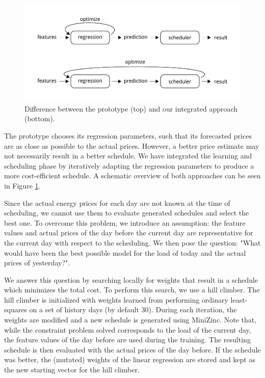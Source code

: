 \documentclass[a4,10pt]{article}
\begin{document}
\begin{figure}
	\centering
	\includegraphics[width=\textwidth]{img/feedback.pdf}
	\caption{Difference between the prototype (top) and our integrated approach (bottom).}
	\label{fig:feedback}
\end{figure}

The prototype chooses its regression parameters, such that its forecasted prices are as close as possible to the actual prices. However, a better price estimate may not necessarily result in a better schedule\cite{ifrim2012properties}. We have integrated the learning and scheduling phase by iteratively adapting the regression parameters to produce a more cost-efficient schedule. A schematic overview of both approaches can be seen in Figure \ref{fig:feedback}.

Since the actual energy prices for each day are not known at the time of scheduling, we cannot use them to evaluate generated schedules and select the best one. To overcome this problem, we introduce an assumption: the feature values and actual prices of the day before the current day are representative for the current day with respect to the scheduling. We then pose the question: "What would have been the best possible model for the load of today and the actual prices of yesterday?".

We answer this question by searching locally for weights that result in a schedule which minimizes the total cost. To perform this search, we use a hill climber. The hill climber is initialized with weights learned from performing ordinary least-squares on a set of history days (by default 30). During each iteration, the weights are modified and a new schedule is generated using MiniZinc. Note that, while the constraint problem solved corresponds to the load of the current day, the feature values of the day before are used during the training. The resulting schedule is then evaluated with the actual prices of the day before. If the schedule was better, the (mutated) weights of the linear regression are stored and kept as the new starting vector for the hill climber.
\end{document}
